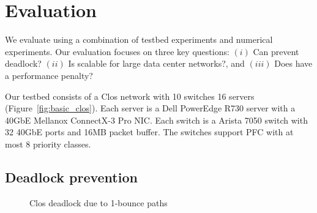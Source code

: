 \section{Evaluation}\label{sec:eval}

We evaluate \sysname{} using a combination of testbed experiments and numerical
experiments. Our evaluation focuses on three key questions: $(i)$ Can \sysname{}
prevent deadlock? $(ii)$ Is \sysname{} scalable for large data center networks?,
and $(iii)$ Does \sysname{} have a performance penalty?


 Our testbed consists of a Clos network with 10 switches 16
servers (Figure~\ref{fig:basic_clos}). Each server is a Dell PowerEdge R730
server with a 40GbE Mellanox ConnectX-3 Pro NIC. Each switch is a Arista
7050 switch with 32 40GbE ports and 16MB packet buffer. The switches
support PFC with at most 8 priority classes.




\subsection{Deadlock prevention}\label{subsec:exp_validation}

\begin{figure}[t]
	\centering
	
	
	\caption{Clos deadlock due to 1-bounce paths}\label{fig:exp_validation_nonloop}
	\vspace{-0.25in}
\end{figure}

